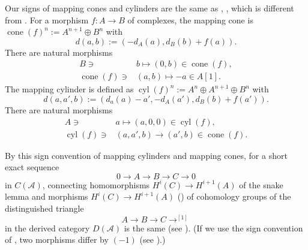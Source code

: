 \documentclass[12pt,a4]{amsart}
\def\cone{\mathop{\mathrm{cone}}\nolimits}
\def\cyl{\mathop{\mathrm{cyl}}\nolimits}
\numberwithin{equation}{section}
\numberwithin{figure}{section}
\begin{document}
  Our signs of mapping cones and cylinders 
    are the same as \cite{ConradGrothendieckDualityandBaseChange2000}, \cite{LawsonInwhichItrytogetthesignsrightforonce2013}, 
    which is different from \cite{WeibelAnintroductiontohomologicalalgebra1984}. 
  For a morphism $f \colon A \to B$ of complexes, 
   the mapping cone is
   $\cone (f)^n:= A^{n+1}\oplus B^n$ 
   with 
   $$d(a,b):= (-d_A (a), d_B (b)+ f(a)).$$
   There are natural morphisms 
   \begin{align*}
    B \ni & b \mapsto (0,b) \in \cone (f) ,  \\
    \cone ( f ) \ni & (a,b) \mapsto - a \in A[1] .
   \end{align*}
   The mapping cylinder is 
   defined as
   $\cyl (f)^n := 
     A^n \oplus A^{n+1} \oplus B^n $
    with $$d(a,a',b):= 
          (d_a(a)-a', 
             -d_A (a'), d_B (b) + f (a') ).$$
   There are natural morphisms 
   \begin{align*}
    A \ni & a \mapsto (a,0,0) \in \cyl (f) , \\
    \cyl ( f ) \ni & (a,a', b) \to (a',b) \in \cone (f) .
   \end{align*}

  By this sign convention of mapping cylinders and mapping cones, 
  for 
    a short exact sequence 
  $$ 0 \to A \to B \to C \to 0$$
    in $C(\mathscr{A})$, 
   connecting homomorphisms $ H^i(C) \to H^{i+1}(A)$
   of the snake lemma 
   and morphisms 
   $ H^i(C) \to H^{i+1}(A)$
    (\cite[Section 1.5 and Definition 10.1.3]{WeibelAnintroductiontohomologicalalgebra1984})
   of cohomology groups of 
   the distinguished triangle
   $$A \to B \to C \to^{[1]}$$ 
   in the derived category $D(\mathscr{A})$ 
   is the same 
   (see  \cite[Section 1.3]{ConradGrothendieckDualityandBaseChange2000}).
   (If we use 
   the sign convention of 
   \cite{WeibelAnintroductiontohomologicalalgebra1984}, 
   two morphisms differ by $(-1)$ 
   (see \cite[Exercise 1.5.6]{WeibelAnintroductiontohomologicalalgebra1984}).)








   


\end{document}
